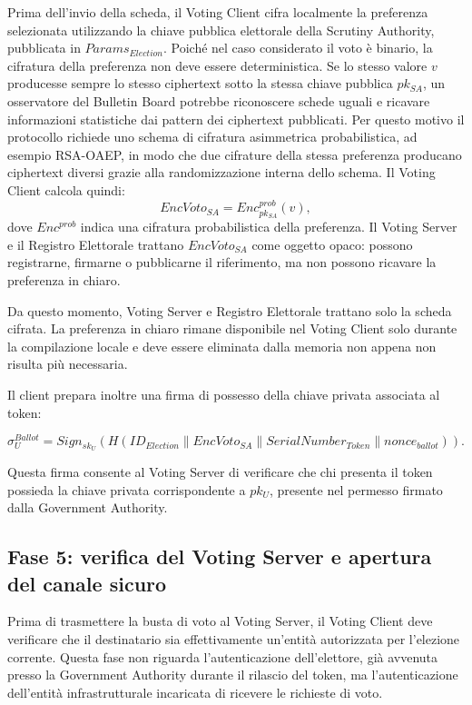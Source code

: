 \documentclass[a4paper,12pt]{article}
\begin{document}
Prima dell'invio della scheda, il Voting Client cifra localmente la preferenza selezionata utilizzando la chiave pubblica elettorale della Scrutiny Authority, pubblicata in \(Params_{Election}\). Poich\'e nel caso considerato il voto \`e binario, la cifratura della preferenza non deve essere deterministica. Se lo stesso valore \(v\) producesse sempre lo stesso ciphertext sotto la stessa chiave pubblica \(pk_{SA}\), un osservatore del Bulletin Board potrebbe riconoscere schede uguali e ricavare informazioni statistiche dai pattern dei ciphertext pubblicati. 
Per questo motivo il protocollo richiede uno schema di cifratura asimmetrica probabilistica, ad esempio RSA-OAEP, in modo che due cifrature della stessa preferenza producano ciphertext diversi grazie alla randomizzazione interna dello schema. 
Il Voting Client calcola quindi: \[ EncVoto_{SA} = Enc_{pk_{SA}}^{prob}(v), \] dove \(Enc^{prob}\) indica una cifratura probabilistica della preferenza. Il Voting Server e il Registro Elettorale trattano \(EncVoto_{SA}\) come oggetto opaco: possono registrarne, firmarne o pubblicarne il riferimento, ma non possono ricavare la preferenza in chiaro.

Da questo momento, Voting Server e Registro Elettorale trattano solo la scheda cifrata. 
La preferenza in chiaro rimane disponibile nel Voting Client solo durante la compilazione locale e deve essere eliminata dalla memoria non appena non risulta pi\`u necessaria.

Il client prepara inoltre una firma di possesso della chiave privata associata al token:

\[
	\sigma_U^{Ballot} =
	Sign_{sk_U}(H(ID_{Election} \parallel EncVoto_{SA} \parallel SerialNumber_{Token} \parallel nonce_{ballot})).
\]

Questa firma consente al Voting Server di verificare che chi presenta il token possieda la chiave privata corrispondente a \(pk_U\), presente nel permesso firmato dalla Government Authority.

\subsection{Fase 5: verifica del Voting Server e apertura del canale sicuro}

Prima di trasmettere la busta di voto al Voting Server, il Voting Client deve verificare che il destinatario sia effettivamente un'entit\`a autorizzata per l'elezione corrente.
Questa fase non riguarda l'autenticazione dell'elettore, gi\`a avvenuta presso la Government Authority durante il rilascio del token, ma l'autenticazione dell'entit\`a infrastrutturale incaricata di ricevere le richieste di voto.
\end{document}
